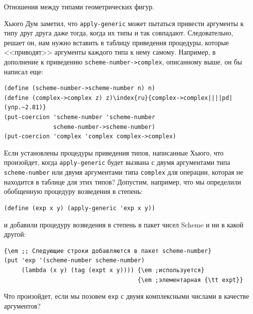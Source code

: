 \begin{cntrfig}

%
%
%
%
\caption{Отношения между типами геометрических фигур.}
\label{F2.26}

\end{cntrfig}
\begin{exercise}{2.81}\label{EX2.81}%
Хьюго Дум заметил, что {\tt apply-generic}
может пытаться привести аргументы к типу друг друга даже тогда, когда
их типы и так совпадают.  Следовательно, решает он, нам нужно
вставить в таблицу приведения процедуры, которые <<приводят>> аргументы
каждого типа к нему самому.  Например, в дополнение к приведению
{\tt scheme-number->complex}, описанному выше, он бы
написал еще:

\begin{Verbatim}[fontsize=\small]
(define (scheme-number->scheme-number n) n)
(define (complex->complex z) z)\index{ru}{complex->complex||||pd|(упр.~2.81)}
(put-coercion 'scheme-number 'scheme-number
              scheme-number->scheme-number)
(put-coercion 'complex 'complex complex->complex)
\end{Verbatim}

\begin{plainenum}


\item
 Если установлены процедуры приведения типов,
написанные Хьюго, что произойдет, когда {\tt apply-generic} будет
вызвана с двумя аргументами типа {\tt scheme-num\-ber} или двумя
аргументами типа {\tt complex} для операции, которая не
находится в таблице для этих типов?  Допустим, например, что мы
определили обобщенную процедуру возведения в степень:

\begin{Verbatim}[fontsize=\small]
(define (exp x y) (apply-generic 'exp x y))
\end{Verbatim}
и добавили процедуру возведения в степень в пакет чисел Scheme и ни в
какой другой:

\begin{Verbatim}[fontsize=\small]
{\em ;; Следующие строки добавляются в пакет scheme-number}
(put 'exp '(scheme-number scheme-number)
     (lambda (x y) (tag (expt x y)))) {\em ;используется}
                                      {\em ;элементарная {\tt expt}}
\end{Verbatim}
Что произойдет, если мы позовем {\tt exp} с двумя комплексными
числами в качестве аргументов?


\end{plainenum}
\end{exercise}
